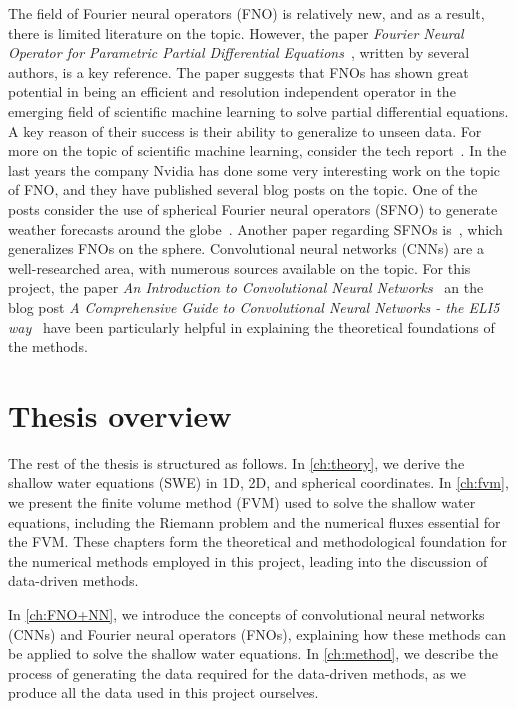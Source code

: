 The field of Fourier neural operators (FNO) is relatively new, and as a result, there is limited literature on the topic.
However, the paper \textit{Fourier Neural Operator for Parametric Partial Differential Equations}~\cite{FNO_2021}, written by several authors, is a key reference.
The paper suggests that FNOs has shown great potential in being an efficient and resolution independent operator in the emerging field of scientific machine learning to solve partial differential equations.
A key reason of their success is their ability to generalize to unseen data.
For more on the topic of scientific machine learning, consider the tech report~\cite{osti_1478744}.
In the last years the company Nvidia has done some very interesting work on the topic of FNO, and they have published several blog posts on the topic.
One of the posts consider the use of spherical Fourier neural operators (SFNO) to generate weather forecasts around the globe~\cite{Nvidia2023}.
Another paper regarding SFNOs is~\cite{bonev2023-SFNO}, which generalizes FNOs on the sphere.
Convolutional neural networks (CNNs) are a well-researched area, with numerous sources available on the topic.
For this project, the paper \textit{An Introduction to Convolutional Neural Networks}~\cite{oshea2015introductionconvolutionalneuralnetworks} an the blog post \textit{A Comprehensive Guide to Convolutional Neural Networks - the ELI5 way}~\cite{chollet2017comprehensive} have been particularly helpful in explaining the theoretical foundations of the methods.

\section{Thesis overview}
The rest of the thesis is structured as follows.
In \autoref{ch:theory}, we derive the shallow water equations (SWE) in 1D, 2D, and spherical coordinates.
In \autoref{ch:fvm}, we present the finite volume method (FVM) used to solve the shallow water equations, including the Riemann problem and the numerical fluxes essential for the FVM.
These chapters form the theoretical and methodological foundation for the numerical methods employed in this project, leading into the discussion of data-driven methods.

In \autoref{ch:FNO+NN}, we introduce the concepts of convolutional neural networks (CNNs) and Fourier neural operators (FNOs), explaining how these methods can be applied to solve the shallow water equations.
In \autoref{ch:method}, we describe the process of generating the data required for the data-driven methods, as we produce all the data used in this project ourselves.

